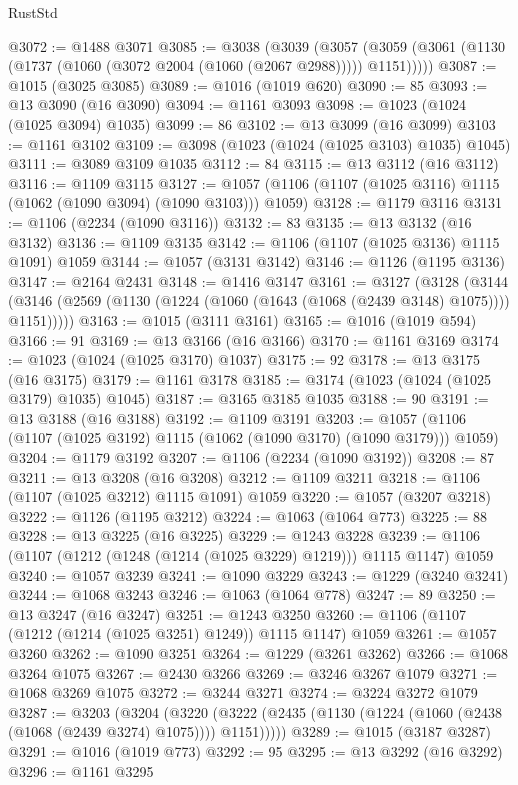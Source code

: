 \begin{lexlean}{RustStd}
\begin{coremodule}
@3072 := @1488 @3071
@3085 := @3038
    (@3039
      (@3057 (@3059 (@3061 (@1130 (@1737 (@1060 (@3072 @2004 (@1060 (@2067 @2988))))) @1151)))))
@3087 := @1015 (@3025 @3085)
@3089 := @1016 (@1019 @620)
@3090 := 85
@3093 := @13 @3090 (@16 @3090)
@3094 := @1161 @3093
@3098 := @1023 (@1024 (@1025 @3094) @1035)
@3099 := 86
@3102 := @13 @3099 (@16 @3099)
@3103 := @1161 @3102
@3109 := @3098 (@1023 (@1024 (@1025 @3103) @1035) @1045)
@3111 := @3089 @3109 @1035
@3112 := 84
@3115 := @13 @3112 (@16 @3112)
@3116 := @1109 @3115
@3127 := @1057 (@1106 (@1107 (@1025 @3116) @1115 (@1062 (@1090 @3094) (@1090 @3103))) @1059)
@3128 := @1179 @3116
@3131 := @1106 (@2234 (@1090 @3116))
@3132 := 83
@3135 := @13 @3132 (@16 @3132)
@3136 := @1109 @3135
@3142 := @1106 (@1107 (@1025 @3136) @1115 @1091) @1059
@3144 := @1057 (@3131 @3142)
@3146 := @1126 (@1195 @3136)
@3147 := @2164 @2431
@3148 := @1416 @3147
@3161 := @3127
    (@3128
      (@3144 (@3146 (@2569 (@1130 (@1224 (@1060 (@1643 (@1068 (@2439 @3148) @1075)))) @1151)))))
@3163 := @1015 (@3111 @3161)
@3165 := @1016 (@1019 @594)
@3166 := 91
@3169 := @13 @3166 (@16 @3166)
@3170 := @1161 @3169
@3174 := @1023 (@1024 (@1025 @3170) @1037)
@3175 := 92
@3178 := @13 @3175 (@16 @3175)
@3179 := @1161 @3178
@3185 := @3174 (@1023 (@1024 (@1025 @3179) @1035) @1045)
@3187 := @3165 @3185 @1035
@3188 := 90
@3191 := @13 @3188 (@16 @3188)
@3192 := @1109 @3191
@3203 := @1057 (@1106 (@1107 (@1025 @3192) @1115 (@1062 (@1090 @3170) (@1090 @3179))) @1059)
@3204 := @1179 @3192
@3207 := @1106 (@2234 (@1090 @3192))
@3208 := 87
@3211 := @13 @3208 (@16 @3208)
@3212 := @1109 @3211
@3218 := @1106 (@1107 (@1025 @3212) @1115 @1091) @1059
@3220 := @1057 (@3207 @3218)
@3222 := @1126 (@1195 @3212)
@3224 := @1063 (@1064 @773)
@3225 := 88
@3228 := @13 @3225 (@16 @3225)
@3229 := @1243 @3228
@3239 := @1106 (@1107 (@1212 (@1248 (@1214 (@1025 @3229) @1219))) @1115 @1147) @1059
@3240 := @1057 @3239
@3241 := @1090 @3229
@3243 := @1229 (@3240 @3241)
@3244 := @1068 @3243
@3246 := @1063 (@1064 @778)
@3247 := 89
@3250 := @13 @3247 (@16 @3247)
@3251 := @1243 @3250
@3260 := @1106 (@1107 (@1212 (@1214 (@1025 @3251) @1249)) @1115 @1147) @1059
@3261 := @1057 @3260
@3262 := @1090 @3251
@3264 := @1229 (@3261 @3262)
@3266 := @1068 @3264 @1075
@3267 := @2430 @3266
@3269 := @3246 @3267 @1079
@3271 := @1068 @3269 @1075
@3272 := @3244 @3271
@3274 := @3224 @3272 @1079
@3287 := @3203
    (@3204
      (@3220 (@3222 (@2435 (@1130 (@1224 (@1060 (@2438 (@1068 (@2439 @3274) @1075)))) @1151)))))
@3289 := @1015 (@3187 @3287)
@3291 := @1016 (@1019 @773)
@3292 := 95
@3295 := @13 @3292 (@16 @3292)
@3296 := @1161 @3295

\end{coremodule}
\end{lexlean}
